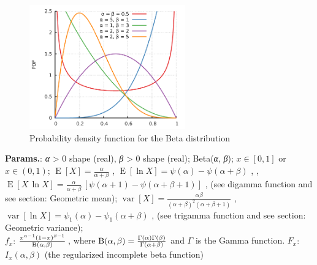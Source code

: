     \begin{figure}[H]
        \centering
        \includegraphics[width=0.6\textwidth]{images/Beta distribution pdf.png}
        \caption{Probability density function for the Beta distribution}
    \end{figure}




    {\color{darkblue} \textbf{Params.}:} {\textit{α} > 0 shape (real), \textit{β} > 0 shape (real)}; {Beta(\textit{α}, \textit{β})}; {$x \in [0, 1]\!$ or $x \in (0, 1)\!$}; {$\operatorname{E}[X] = \frac{\alpha}{\alpha+\beta}\!$ ,  $\operatorname{E}[\ln X] = \psi(\alpha) - \psi(\alpha + \beta)\!$ , ,  $\operatorname{E}[X \, \ln X] = \frac{\alpha}{\alpha+\beta}\,\left[\psi(\alpha+1)-\psi(\alpha+\beta+1)\right]\!$ , (see digamma function and see section: Geometric mean)}; {$\operatorname{var}[X] = \frac{\alpha\beta}{(\alpha+\beta)^2(\alpha+\beta+1)}\!$ ,  $\operatorname{var}[\ln X] = \psi_1(\alpha) - \psi_1(\alpha + \beta)\!$ , (see trigamma function and see section: Geometric variance)};\hspace{0.5cm}\\{\color{darkblue} \textbf{$f_x$}:} {$\frac{x^{\alpha-1}(1-x)^{\beta-1}} {\mathrm{B}(\alpha,\beta)}\!$ , where $\mathrm{B}(\alpha,\beta) = \frac{\Gamma(\alpha)\Gamma(\beta)}{\Gamma(\alpha + \beta)}$ and $\Gamma$ is the Gamma function.}{\color{darkblue} \textbf{$F_x$}:} {$I_x(\alpha,\beta)\!$ (the regularized incomplete beta function)}



